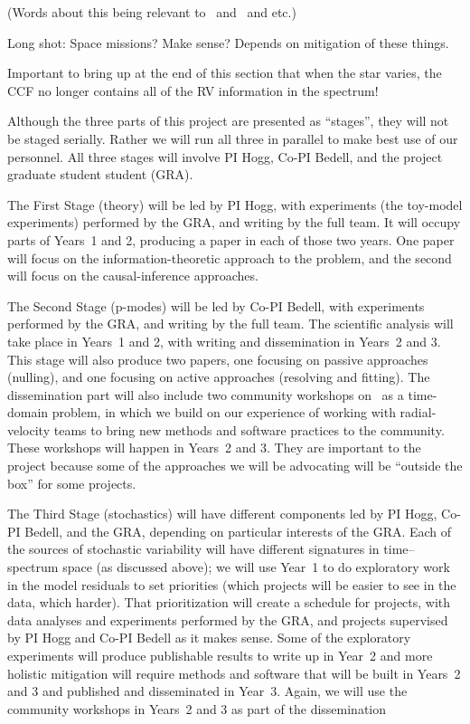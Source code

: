 \documentclass[12pt, letterpaper]{article}
\begin{document}
(Words about this being relevant to \NASA\ and \XRP\ and etc.)

Long shot: Space missions? Make sense? Depends on mitigation of these things.


Important to bring up at the end of this section that when the star
varies, the CCF no longer contains all of the RV information in the
spectrum!




Although the three parts of this project are presented as ``stages'',
they will not be staged serially.
Rather we will run all three in parallel to make best use of our
personnel.
All three stages will involve PI Hogg, Co-PI Bedell, and the project
graduate student student (GRA). 

The First Stage (theory) will be led by PI Hogg, with experiments (the
toy-model experiments) performed by the GRA, and writing by the full
team.
It will occupy parts of Years~1 and 2, producing a paper
in each of those two years.
One paper will focus on the information-theoretic approach to the problem,
and the second will focus on the causal-inference approaches.

The Second Stage (p-modes) will be led by Co-PI Bedell, with
experiments performed by the GRA, and writing by the full team.
The scientific analysis will take place in Years~1 and 2, with
writing and dissemination in Years~2 and 3.
This stage will also produce two papers, one focusing on passive
approaches (nulling), and one focusing on active approaches (resolving
and fitting).
The dissemination part will also include two community workshops on
\EPRV\ as a time-domain problem, in which we build on our experience
of working with radial-velocity teams to bring new methods and
software practices to the community.
These workshops will happen in Years~2 and 3.
They are important to the project because some of the approaches we
will be advocating will be ``outside the box'' for some projects.

The Third Stage (stochastics) will have different components led by PI
Hogg, Co-PI Bedell, and the GRA, depending on particular interests of
the GRA.
Each of the sources of stochastic variability will have different
signatures in time--spectrum space (as discussed above); we will use
Year~1 to do exploratory work in the model residuals to set priorities
(which projects will be easier to see in the data, which harder).
That prioritization will create a schedule for projects, with data
analyses and experiments performed by the GRA, and projects supervised
by PI Hogg and Co-PI Bedell as it makes sense.
Some of the exploratory experiments will produce publishable results
to write up in Year~2 and more holistic mitigation will require
methods and software that will be built in Years~2 and 3 and published
and disseminated in Year~3.
Again, we will use the community workshops in Years~2 and 3 as part of
the dissemination
\end{document}
